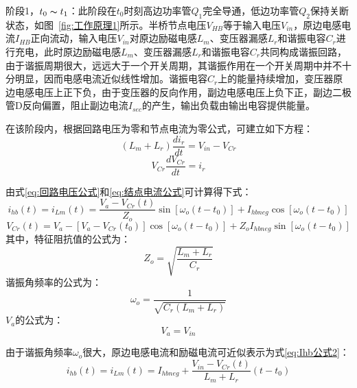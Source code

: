 阶段1，$t_0 \thicksim t_1$：此阶段在$t_0$时刻高边功率管$Q_1$完全导通，低边功率管$Q_2$保持关断状态，如图~\ref{fig:工作原理1}所示。半桥节点电压$V_{HB}$等于输入电压$V_{in}$，原边电感电流$I_{HB}$正向流动，输入电压$V_{in}$对原边励磁电感$L_m$、变压器漏感$L_r$和谐振电容$C_r$进行充电，此时原边励磁电感$L_m$、变压器漏感$L_r$和谐振电容$C_r$共同构成谐振回路，由于谐振周期很大，远远大于一个开关周期，其谐振作用在一个开关周期中并不十分明显，因而电感电流近似线性增加。谐振电容$C_r$上的能量持续增加，变压器原边电感电压上正下负，由于变压器的反向作用，副边电感电压上负下正，副边二极管D反向偏置，阻止副边电流$I_{sec}$的产生，输出负载由输出电容提供能量。

在该阶段内，根据回路电压为零和节点电流为零公式，可建立如下方程：
\begin{equation}
    \label{eq:回路电压公式}
    (L_m + L_r)\frac{di_r}{dt} = V_{in} - V_{Cr}  
\end{equation}
\begin{equation}
    \label{eq:结点电流公式}
    V_{Cr}\frac{dV_{Cr}}{dt} = i_r 
\end{equation}

由式\eqref{eq:回路电压公式}和\eqref{eq:结点电流公式}可计算得下式：
\begin{equation}
    \label{eq:Ihb公式1}
    i_{hb}(t) = i_{Lm}(t) = \frac{V_{a}-V_{Cr}(t)}{Z_o}\sin[\omega_o(t-t_0)] + I_{hbneg}\cos[\omega_o(t-t_0)]  
\end{equation}
\begin{equation}
    \label{eq:Vcr公式}
    V_{Cr}(t) =V_{a}-[V_{a}-V_{Cr}(t_0)]\cos[\omega_o(t-t_0)] + {Z_o} I_{hbneg} \sin[\omega_o(t-t_0)]
\end{equation}
其中，特征阻抗值的公式为：
\begin{equation}
    \label{eq:Zo公式}
    Z_o=\sqrt{\frac{L_m+L_r}{C_r}}  
\end{equation}
谐振角频率的公式为：
\begin{equation}
    \label{eq:omega_o公式}
    \omega_o=\frac{1}{\sqrt{C_r(L_m+L_r)}}
\end{equation}
$V_{a}$的公式为：
\begin{equation}
    \label{eq:Vhb公式1}
    V_{a}=V_{in}
\end{equation}

由于谐振角频率$\omega_o$很大，原边电感电流和励磁电流可近似表示为式\eqref{eq:Ihb公式2}：
\begin{equation}
    \label{eq:Ihb公式2}
    i_{hb}(t) = i_{Lm}(t) = I_{hbneg} + \frac{V_{in}-V_{Cr}(t)}{L_m + L_r}(t-t_0)
\end{equation}



